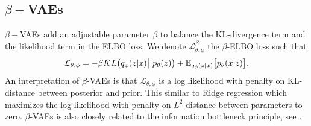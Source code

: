 \documentclass[12pt]{report}
\theoremstyle{definition}
\theoremstyle{remark}
\newcommand{\E}{\mathbb{E}}
\begin{document}
\subsection{$\beta-$VAEs}
$\beta-$VAEs \cite{higgins2016beta} add an adjustable parameter $\beta$ to balance the KL-divergence term and the likelihood term in the ELBO loss. We denote $\mathcal{L}^{\beta}_{\theta, \phi}$ the $\beta$-ELBO loss such that 
\begin{equation}
  \mathcal{L}_{\theta, \phi} = -\beta KL\big(q_{\phi}(z|x) \big|\big| p_{\theta}(z)\big) + \E_{q_{\phi}(z|x)}\big[p_{\theta}(x|z)\big].\\
\end{equation}
An interpretation of $\beta$-VAEs is that $\mathcal{L}_{\theta, \phi}$ is a log likelihood with penalty on KL-distance between posterior and prior. This similar to Ridge regression which maximizes the log likelihood with penalty on $L^{2}$-distance between parameters to zero. $\beta$-VAEs is also closely related to the information bottleneck principle, see \cite{higgins2016beta}.
\end{document}
